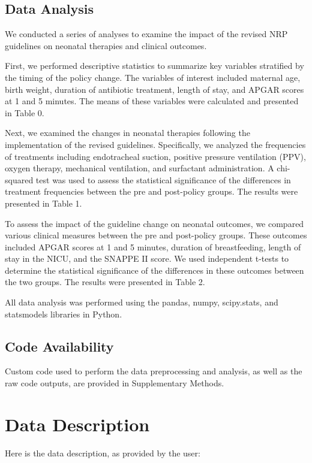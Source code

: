 \documentclass[11pt]{article}
\begin{document}
\subsection*{Data Analysis}
We conducted a series of analyses to examine the impact of the revised NRP guidelines on neonatal therapies and clinical outcomes. 

First, we performed descriptive statistics to summarize key variables stratified by the timing of the policy change. The variables of interest included maternal age, birth weight, duration of antibiotic treatment, length of stay, and APGAR scores at 1 and 5 minutes. The means of these variables were calculated and presented in Table 0.

Next, we examined the changes in neonatal therapies following the implementation of the revised guidelines. Specifically, we analyzed the frequencies of treatments including endotracheal suction, positive pressure ventilation (PPV), oxygen therapy, mechanical ventilation, and surfactant administration. A chi-squared test was used to assess the statistical significance of the differences in treatment frequencies between the pre and post-policy groups. The results were presented in Table 1.

To assess the impact of the guideline change on neonatal outcomes, we compared various clinical measures between the pre and post-policy groups. These outcomes included APGAR scores at 1 and 5 minutes, duration of breastfeeding, length of stay in the NICU, and the SNAPPE II score. We used independent t-tests to determine the statistical significance of the differences in these outcomes between the two groups. The results were presented in Table 2.

All data analysis was performed using the pandas, numpy, scipy.stats, and statsmodels libraries in Python.\subsection*{Code Availability}

Custom code used to perform the data preprocessing and analysis, as well as the raw code outputs, are provided in Supplementary Methods.


\clearpage
\appendix

\section{Data Description} \label{sec:data_description} Here is the data description, as provided by the user:
\end{document}
